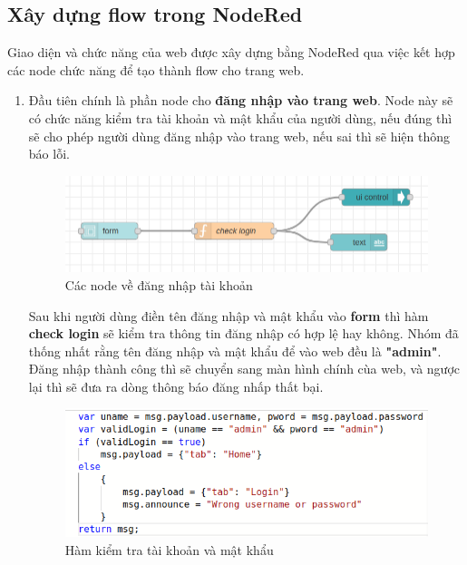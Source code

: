 \documentclass{report}
\begin{document}
\newpage
\subsection{Xây dựng flow trong NodeRed}
Giao diện và chức năng của web được xây dựng bằng NodeRed qua việc kết hợp các node chức năng để  tạo thành flow cho trang web.


\begin{enumerate}
    \item Đầu tiên chính là phần node cho \textbf{đăng nhập vào trang web}. Node này sẽ có chức năng kiểm tra tài khoản và mật khẩu của người dùng, nếu đúng thì sẽ cho phép người dùng đăng nhập vào trang web, nếu sai thì sẽ hiện thông báo lỗi.
    \begin{figure}[H]
        \includegraphics[width=\textwidth, keepaspectratio]{img/flow/login_node.png}
        \centering
        \caption{Các node về đăng nhập tài khoản}
    \end{figure}
    Sau khi người dùng điền tên đăng nhập và mật khẩu vào \textbf{form} thì hàm \textbf{check login} sẽ kiểm tra thông tin đăng nhập có hợp lệ hay không. Nhóm đã thống nhất rằng tên đăng nhập và mật khẩu để vào web đều là \textbf{"admin"}. Đăng nhập thành công thì sẽ chuyển sang màn hình chính cùa web, và ngược lại thì sẽ đưa ra dòng thông báo đăng nhấp thất bại.
    \begin{figure}[H]
        \includegraphics[width=\textwidth, keepaspectratio]{img/flow/check_login.png}
        \centering
        \caption{Hàm kiểm tra tài khoản và mật khẩu}
    \end{figure}


\end{enumerate}
\end{document}
